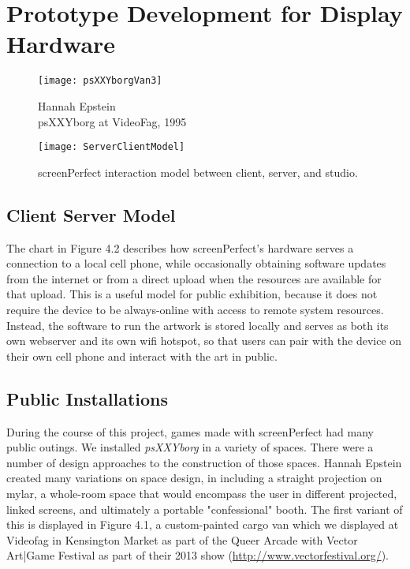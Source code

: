 
\chapter{Prototype Development for Display Hardware}\thispagestyle{empty} %

\label{Chapter4} 

\begin{figure}[!ht]
 \centering
  \texttt{[image: psXXYborgVan3]}
  \caption{Hannah Epstein\\ psXXYborg at VideoFag, 1995}
\end{figure}

\clearpage
\begin{figure}[!ht]
 \centering
  \texttt{[image: ServerClientModel]}
  \caption{screenPerfect interaction model between client, server, and studio.}
\end{figure}
\clearpage
\section{Client Server Model}

The chart in Figure 4.2 describes how screenPerfect's hardware serves a connection to a local cell phone, while occasionally obtaining software updates from the internet or from a direct upload when the resources are available for that upload. This is a useful model for public exhibition, because it does not require the device to be always-online with access to remote system resources. Instead, the software to run the artwork is stored locally and serves as both its own webserver and its own wifi hotspot, so that users can pair with the device on their own cell phone and interact with the art in public.

\section{Public Installations}
During the course of this project, games made with screenPerfect had many public outings. We installed \textit{psXXYborg} in a variety of spaces. There were a number of design approaches to the construction of those spaces. Hannah Epstein created many variations on space design, in including a straight projection on mylar, a whole-room space that would encompass the user in different projected, linked screens, and ultimately a portable "confessional" booth. The first variant of this is displayed in Figure 4.1, a custom-painted cargo van which we displayed at Videofag in Kensington Market as part of the Queer Arcade with Vector Art|Game Festival as part of their 2013 show (\url{http://www.vectorfestival.org/}).

